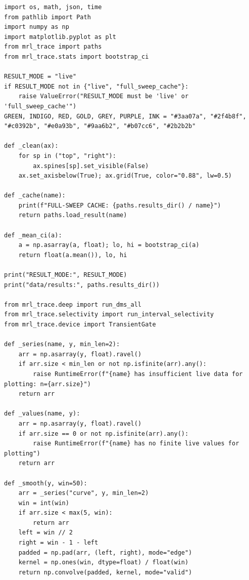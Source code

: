 \begin{lstlisting}[caption={04\_temporal\_selectivity.ipynb code cell 1},label={lst:mrl-nb-04-temporal-selectivity-1}]
import os, math, json, time
from pathlib import Path
import numpy as np
import matplotlib.pyplot as plt
from mrl_trace import paths
from mrl_trace.stats import bootstrap_ci

RESULT_MODE = "live"
if RESULT_MODE not in {"live", "full_sweep_cache"}:
    raise ValueError("RESULT_MODE must be 'live' or 'full_sweep_cache'")
GREEN, INDIGO, RED, GOLD, GREY, PURPLE, INK = "#3aa07a", "#2f4b8f", "#c0392b", "#e0a93b", "#9aa6b2", "#b07cc6", "#2b2b2b"

def _clean(ax):
    for sp in ("top", "right"):
        ax.spines[sp].set_visible(False)
    ax.set_axisbelow(True); ax.grid(True, color="0.88", lw=0.5)

def _cache(name):
    print(f"FULL-SWEEP CACHE: {paths.results_dir() / name}")
    return paths.load_result(name)

def _mean_ci(a):
    a = np.asarray(a, float); lo, hi = bootstrap_ci(a)
    return float(a.mean()), lo, hi

print("RESULT_MODE:", RESULT_MODE)
print("data/results:", paths.results_dir())

from mrl_trace.deep import run_dms_all
from mrl_trace.selectivity import run_interval_selectivity
from mrl_trace.device import TransientGate

def _series(name, y, min_len=2):
    arr = np.asarray(y, float).ravel()
    if arr.size < min_len or not np.isfinite(arr).any():
        raise RuntimeError(f"{name} has insufficient live data for plotting: n={arr.size}")
    return arr

def _values(name, y):
    arr = np.asarray(y, float).ravel()
    if arr.size == 0 or not np.isfinite(arr).any():
        raise RuntimeError(f"{name} has no finite live values for plotting")
    return arr

def _smooth(y, win=50):
    arr = _series("curve", y, min_len=2)
    win = int(win)
    if arr.size < max(5, win):
        return arr
    left = win // 2
    right = win - 1 - left
    padded = np.pad(arr, (left, right), mode="edge")
    kernel = np.ones(win, dtype=float) / float(win)
    return np.convolve(padded, kernel, mode="valid")
\end{lstlisting}

